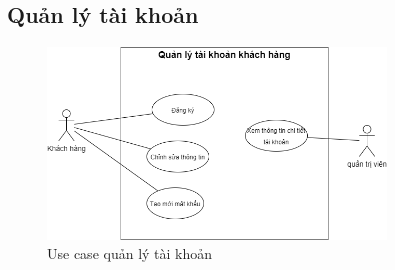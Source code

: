    
   \subsection{Quản lý tài khoản}
        \begin{figure}[!htp]
            \centering
            \includegraphics[width=9cm]{img/UseCase/UseCase-Quản lý tài khoản.drawio.png}
            \newline
         \caption{Use case quản lý tài khoản}
        \end{figure}
        
